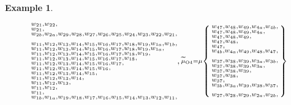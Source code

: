 \documentclass{amsart}
\theoremstyle{plain}
\theoremstyle{definition}
\newtheorem{example}[theorem]{Example}
\theoremstyle{remark}
\newcommand{\muint}[1]{\widetilde{\mu}_{\text{#1}}}
\begin{document}
\begin{example}
\begin{figure}[h]
\begin{align*}
{\begin{subarray}{l}
w_{21}, w_{22}, \\
w_{21}, \\
w_{2b}, w_{2a}, w_{29}, w_{28}, w_{27}, w_{26}, w_{25}, w_{24}, w_{23}, w_{22}, w_{21}, \\
\\
w_{11}, w_{12}, w_{13}, w_{14}, w_{15}, w_{16}, w_{17}, w_{18}, w_{19}, w_{1a}, w_{1b}, \\
w_{11}, w_{12}, w_{13}, w_{14}, w_{15}, w_{16}, w_{17}, w_{18}, w_{19}, w_{1a}, \\
w_{11}, w_{12}, w_{13}, w_{14}, w_{15}, w_{16}, w_{17}, w_{18}, w_{19}, \\
w_{11}, w_{12}, w_{13}, w_{14}, w_{15}, w_{16}, w_{17}, w_{18}, \\
w_{11}, w_{12}, w_{13}, w_{14}, w_{15}, w_{16}, w_{17}, \\
w_{11}, w_{12}, w_{13}, w_{14}, w_{15}, w_{16}, \\
w_{11}, w_{12}, w_{13}, w_{14}, w_{15}, \\
w_{11}, w_{12}, w_{13}, w_{14}, \\
w_{11}, w_{12}, w_{13}, \\
w_{11}, w_{12}, \\
w_{11}, \\
w_{1b}, w_{1a}, w_{19}, w_{18}, w_{17}, w_{16}, w_{15}, w_{14}, w_{13}, w_{12}, w_{11}, \\
          \end{subarray}
        },
        \substack{
          \muint{O4} = \mu\Set{
            \begin{subarray}{l}
w_{47}, w_{48}, w_{49}, w_{4a}, w_{4b}, \\
w_{47}, w_{48}, w_{49}, w_{4a}, \\
w_{47}, w_{48}, w_{49}, \\
w_{47}, w_{48}, \\
w_{47}, \\
w_{4b}, w_{4a}, w_{49}, w_{48}, w_{47}, \\
\\
w_{37}, w_{38}, w_{39}, w_{3a}, w_{3b}, \\
w_{37}, w_{38}, w_{39}, w_{3a}, \\
w_{37}, w_{38}, w_{39}, \\
w_{37}, w_{38}, \\
w_{37}, \\
w_{3b}, w_{3a}, w_{39}, w_{38}, w_{37}, \\
\\
w_{27}, w_{28}, w_{29}, w_{2a}, w_{2b}, \\

\end{subarray}}}
\end{align*}
\end{figure}
\end{example}
\end{document}
